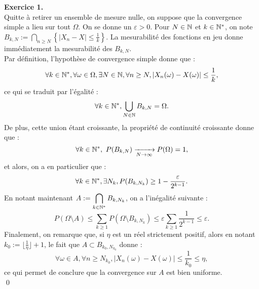 \documentclass[12pt,a4paper]{article}
\begin{document}
\textbf{Exercice 1.}\\

Quitte à retirer un ensemble de mesure nulle, on suppose que la convergence simple a lieu sur tout $\Omega$. On se donne un $\varepsilon > 0$. Pour $N\in \mathbb N$ et $k \in \mathbb N^* $, on note $\displaystyle B_{k,N} := \bigcap_{n\geq N} \left\{|X_n-X | \leq \frac{1}{k} \right \}$. La mesurabilité des fonctions en jeu donne immédiatement la mesurabilité des $B_{k,N}$. \\ 

\noindent Par définition, l'hypothèse de convergence simple donne que : \[ \forall k \in \mathbb N^*, \forall \omega \in \Omega, \exists N \in \mathbb N, \forall n\geq N, |X_n(\omega)-X(\omega) | \leq \frac{1}{k},   \] ce qui se traduit par l'égalité :
\[\forall k \in \mathbb N^*, \bigcup_{N\in \mathbb N}B_{k,N} = \Omega.\]
De plus, cette union étant croissante, la propriété de continuité croissante donne que : \[\forall k \in \mathbb N^*, \  P(B_{k,N}) \xrightarrow[N \to \infty]{} P(\Omega)=1, \]
et alors, on a en particulier que : \[\forall k \in \mathbb N^*, \exists N_k, P(B_{k,N_k}) \geq 1-\frac{\varepsilon}{2^{k-1}}.\]
En notant maintenant $\displaystyle A:=\bigcap_{k\in\mathbb N^*}B_{k,N_k}$, on a l'inégalité suivante :
\[P(\Omega\setminus A) \leq \sum_{k\geq 1} P(\Omega\setminus B_{k,N_k}) \leq \varepsilon\sum_{k\geq 1} \frac{1}{2^{k-1}} \leq \varepsilon. \]
Finalement, on remarque que, si $\eta$ est un réel strictement positif, alors en notant $k_0 := \lfloor \frac{1}{\eta}\rfloor +1$, le fait que $A \subset B_{k_0,N_{k_0}}$ donne :
\[\forall \omega \in A, \forall n \geq N_{k_0}, |X_n(\omega)-X(\omega) | \leq \frac{1}{k_0} \leq \eta, \]
ce qui permet de conclure que la convergence sur $A$ est bien uniforme.  \\ \qed
\end{document}

